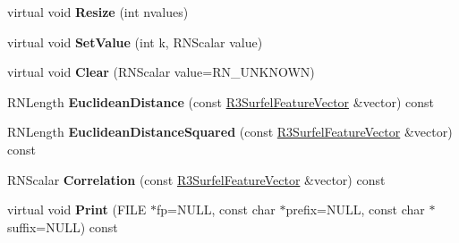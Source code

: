 \begin{DoxyCompactItemize}
\item 
virtual void {\bfseries Resize} (int nvalues)\hypertarget{class_r3_surfel_feature_vector_a6afee5b70aa94e744a0f985da1b7cbbe}{}\label{class_r3_surfel_feature_vector_a6afee5b70aa94e744a0f985da1b7cbbe}

\item 
virtual void {\bfseries Set\+Value} (int k, R\+N\+Scalar value)\hypertarget{class_r3_surfel_feature_vector_a64ec3bc8d6b073fb4d66fd93e940e7ba}{}\label{class_r3_surfel_feature_vector_a64ec3bc8d6b073fb4d66fd93e940e7ba}

\item 
virtual void {\bfseries Clear} (R\+N\+Scalar value=R\+N\+\_\+\+U\+N\+K\+N\+O\+WN)\hypertarget{class_r3_surfel_feature_vector_aab66f112e8b73f34942154d01704825f}{}\label{class_r3_surfel_feature_vector_aab66f112e8b73f34942154d01704825f}

\item 
R\+N\+Length {\bfseries Euclidean\+Distance} (const \hyperlink{class_r3_surfel_feature_vector}{R3\+Surfel\+Feature\+Vector} \&vector) const \hypertarget{class_r3_surfel_feature_vector_ad311a7c3613bd6faf9b10ebaab29f418}{}\label{class_r3_surfel_feature_vector_ad311a7c3613bd6faf9b10ebaab29f418}

\item 
R\+N\+Length {\bfseries Euclidean\+Distance\+Squared} (const \hyperlink{class_r3_surfel_feature_vector}{R3\+Surfel\+Feature\+Vector} \&vector) const \hypertarget{class_r3_surfel_feature_vector_a7c0c5a03304ece52d0c2e4169a969efb}{}\label{class_r3_surfel_feature_vector_a7c0c5a03304ece52d0c2e4169a969efb}

\item 
R\+N\+Scalar {\bfseries Correlation} (const \hyperlink{class_r3_surfel_feature_vector}{R3\+Surfel\+Feature\+Vector} \&vector) const \hypertarget{class_r3_surfel_feature_vector_a98740ff31dd0b3ba8f7dc7f8f86ed366}{}\label{class_r3_surfel_feature_vector_a98740ff31dd0b3ba8f7dc7f8f86ed366}

\item 
virtual void {\bfseries Print} (F\+I\+LE $\ast$fp=N\+U\+LL, const char $\ast$prefix=N\+U\+LL, const char $\ast$suffix=N\+U\+LL) const \hypertarget{class_r3_surfel_feature_vector_a9836b789fb3366c3c578b4f36009fcd6}{}\label{class_r3_surfel_feature_vector_a9836b789fb3366c3c578b4f36009fcd6}

\end{DoxyCompactItemize}
